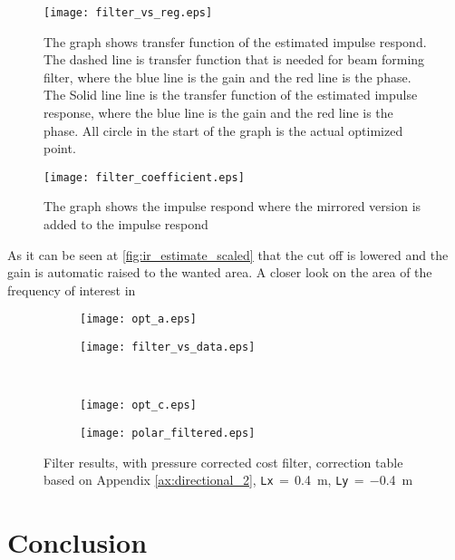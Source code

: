 

\begin{figure}[H]
	\centering
	\texttt{[image: filter\_vs\_reg.eps]}
	\caption{The graph shows transfer function of the estimated impulse respond. The dashed line is transfer function that is needed for beam forming filter, where the blue line is the gain and the red line is the phase. The Solid line line is the transfer function of the estimated impulse response, where the blue line is the gain and the red line is the phase. All circle in the start of the graph is the actual optimized point.}
		\label{fig:filter_vs_reg}
\end{figure}

\begin{figure}[H]
	\centering
	\texttt{[image: filter\_coefficient.eps]}
	\caption{The graph shows the impulse respond where the mirrored version is added to the impulse respond}
		\label{fig:filter_coefficient}
\end{figure}

As it can be seen at \autoref{fig:ir_estimate_scaled} that the cut off is lowered and the gain is automatic raised to the wanted area. A closer look on the area of the frequency of interest in 


\begin{figure}[H]
\begin{subfigure}[c]{0.5\textwidth}
\texttt{[image: opt\_a.eps]}
\label{fig:opt_res_a}
\end{subfigure}
\begin{subfigure}[c]{0.5\textwidth}
\texttt{[image: filter\_vs\_data.eps]}
\label{fig:filter_vs_data}
\end{subfigure}\\
\hspace{0.1\textheight}
\begin{subfigure}[c]{0.5\textwidth}
\texttt{[image: opt\_c.eps]}
\label{fig:opt_res_c}
\end{subfigure}
\begin{subfigure}[c]{0.5\textwidth}
\texttt{[image: polar\_filtered.eps]}
\label{fig:polar_filtered}
\end{subfigure}
\caption{Filter results, with pressure corrected cost filter, correction table based on Appendix \ref{ax:directional_2}, \textcolor{green3}{\texttt{Lx}}\,$=$\,\SI{0.4}{\meter}, \textcolor{green3}{\texttt{Ly}}\,$=\,$\SI{-0.4}{\meter}}
		\label{fig:opt_res}
\end{figure}


\section{Conclusion}